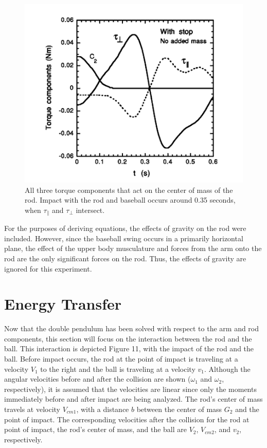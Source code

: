 \documentclass[%
 aip,
 amsmath,amssymb,
 reprint,%
 floatfix,%
]{revtex4-1}
\begin{document}
\begin{figure}[H]
	\centering
	\includegraphics[scale=0.4]{totaltorque.png}
	\caption{All three torque components that act on the center of mass of the rod. Impact with the rod and baseball occurs around 0.35 seconds, when $\tau_{\parallel}$ and $\tau_{\perp}$ intersect.}
\end{figure}

For the purposes of deriving equations, the effects of gravity on the rod were included. However, since the baseball swing occurs in a primarily horizontal plane, the effect of the upper body musculature and forces from the arm onto the rod are the only significant forces on the rod. Thus, the effects of gravity are ignored for this experiment.

\section{\label{sec:level5}Energy Transfer}

Now that the double pendulum has been solved with respect to the arm and rod components, this section will focus on the interaction between the rod and the ball. This interaction is depicted Figure 11, with the impact of the rod and the ball. Before impact occurs, the rod at the point of impact is traveling at a velocity $V_1$ to the right and the ball is traveling at a velocity $v_1$. Although the angular velocities before and after the collision are shown ($\omega_1$ and $\omega_2$, respectively), it is assumed that the velocities are linear since only the moments immediately before and after impact are being analyzed. The rod's center of mass travels at velocity $V_{cm1}$, with a distance $b$ between the center of mass $G_2$ and the point of impact. The corresponding velocities after the collision for the rod at point of impact, the rod's center of mass, and the ball are $V_2$, $V_{cm2}$, and $v_2$, respectively.
\end{document}
